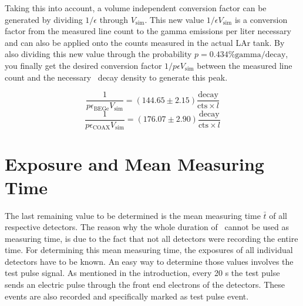 \documentclass[encoding=utf8,british]{tumphthesis}
\begin{document}
Taking this into account, a volume independent conversion factor can be generated by dividing $1 / \epsilon$ through $V_{\mathrm{sim}}$.
This new value $1 / \epsilon V_{\mathrm{sim}}$ is a conversion factor from the measured line count to the gamma emissions per liter necessary and can also be applied onto the counts measured in the actual LAr tank.
By also dividing this new value through the probability $p=0.434\% \mathrm{gamma} /  \mathrm{decay}$, you finally get the desired conversion factor $1 / p\epsilon V_ {\mathrm{sim}}$ between the measured line count and the necessary \Kr\ decay density to generate this peak. 
 
\begin{equation*}
\frac{1}{ p \epsilon_{\mathrm{BEGe}} V_{\mathrm{sim}}} = (144.65\pm2.15) \frac{\mathrm{decay}}{\mathrm{cts}\times \unit{l}}
\end{equation*}
\begin{equation*}
\frac{1}{p \epsilon_{\mathrm{COAX}} V_{\mathrm{sim}}} = (176.07\pm2.90) \frac{\mathrm{decay}}{\mathrm{cts} \times \unit{l}}
\end{equation*}

\section{Exposure and Mean Measuring Time}
\label{sec:CalcActiv}

The last remaining value to be determined is the mean measuring time $\bar{t}$ of all respective detectors.
The reason why the whole duration of \PII\ cannot be used as measuring time, is due to the fact that not all detectors were recording the entire time.
For determining this mean measuring time, the exposures of all individual detectors have to be known.
An easy way to determine those values involves the test pulse signal.
As mentioned in the introduction, every 20 s the test pulse sends an electric pulse through the front end electrons of the detectors.
These events are also recorded and specifically marked as test pulse event. 
\\
\end{document}
